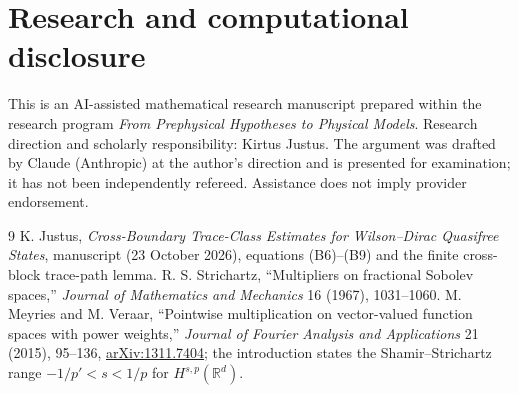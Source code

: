 \documentclass[11pt,a4paper]{article}
\theoremstyle{definition}\newtheorem{definition}[theorem]{Definition}
\begin{document}
\section*{Research and computational disclosure}
This is an AI-assisted mathematical research manuscript prepared within the research program \emph{From Prephysical Hypotheses to Physical Models}. Research direction and scholarly responsibility: Kirtus Justus. The argument was drafted by Claude (Anthropic) at the author's direction and is presented for examination; it has not been independently refereed. Assistance does not imply provider endorsement.

\begin{thebibliography}{9}
 K. Justus, \emph{Cross-Boundary Trace-Class Estimates for Wilson--Dirac Quasifree States}, manuscript (23 October 2026), equations (B6)--(B9) and the finite cross-block trace-path lemma.
 R. S. Strichartz, ``Multipliers on fractional Sobolev spaces,'' \emph{Journal of Mathematics and Mechanics} 16 (1967), 1031--1060.
 M. Meyries and M. Veraar, ``Pointwise multiplication on vector-valued function spaces with power weights,'' \emph{Journal of Fourier Analysis and Applications} 21 (2015), 95--136, \href{https://arxiv.org/abs/1311.7404}{arXiv:1311.7404}; the introduction states the Shamir--Strichartz range $-1/p'<s<1/p$ for $H^{s,p}(\mathbb R^d)$.
\end{thebibliography}
\end{document}
